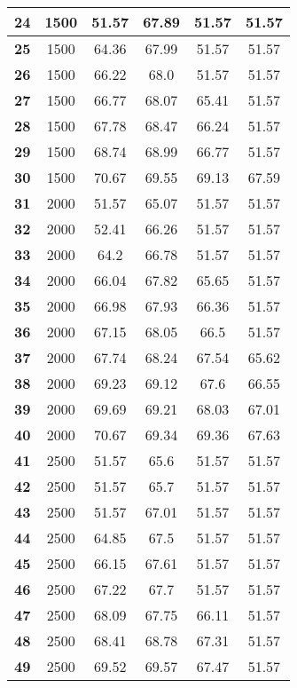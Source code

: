 \begin{longtable}{|c|c|c|c|c|c|}
\textbf{24} & 1500 & 51.57 & 67.89 & 51.57 & 51.57 \\ \hline 
\textbf{25} & 1500 & 64.36 & 67.99 & 51.57 & 51.57 \\ \hline 
\textbf{26} & 1500 & 66.22 & 68.0 & 51.57 & 51.57 \\ \hline 
\textbf{27} & 1500 & 66.77 & 68.07 & 65.41 & 51.57 \\ \hline 
\textbf{28} & 1500 & 67.78 & 68.47 & 66.24 & 51.57 \\ \hline 
\textbf{29} & 1500 & 68.74 & 68.99 & 66.77 & 51.57 \\ \hline 
\textbf{30} & 1500 & 70.67 & 69.55 & 69.13 & 67.59 \\ \hline 
\textbf{31} & 2000 & 51.57 & 65.07 & 51.57 & 51.57 \\ \hline 
\textbf{32} & 2000 & 52.41 & 66.26 & 51.57 & 51.57 \\ \hline 
\textbf{33} & 2000 & 64.2 & 66.78 & 51.57 & 51.57 \\ \hline 
\textbf{34} & 2000 & 66.04 & 67.82 & 65.65 & 51.57 \\ \hline 
\textbf{35} & 2000 & 66.98 & 67.93 & 66.36 & 51.57 \\ \hline 
\textbf{36} & 2000 & 67.15 & 68.05 & 66.5 & 51.57 \\ \hline 
\textbf{37} & 2000 & 67.74 & 68.24 & 67.54 & 65.62 \\ \hline 
\textbf{38} & 2000 & 69.23 & 69.12 & 67.6 & 66.55 \\ \hline 
\textbf{39} & 2000 & 69.69 & 69.21 & 68.03 & 67.01 \\ \hline 
\textbf{40} & 2000 & 70.67 & 69.34 & 69.36 & 67.63 \\ \hline 
\textbf{41} & 2500 & 51.57 & 65.6 & 51.57 & 51.57 \\ \hline 
\textbf{42} & 2500 & 51.57 & 65.7 & 51.57 & 51.57 \\ \hline 
\textbf{43} & 2500 & 51.57 & 67.01 & 51.57 & 51.57 \\ \hline 
\textbf{44} & 2500 & 64.85 & 67.5 & 51.57 & 51.57 \\ \hline 
\textbf{45} & 2500 & 66.15 & 67.61 & 51.57 & 51.57 \\ \hline 
\textbf{46} & 2500 & 67.22 & 67.7 & 51.57 & 51.57 \\ \hline 
\textbf{47} & 2500 & 68.09 & 67.75 & 66.11 & 51.57 \\ \hline 
\textbf{48} & 2500 & 68.41 & 68.78 & 67.31 & 51.57 \\ \hline 
\textbf{49} & 2500 & 69.52 & 69.57 & 67.47 & 51.57 \\ \hline 

\end{longtable}
